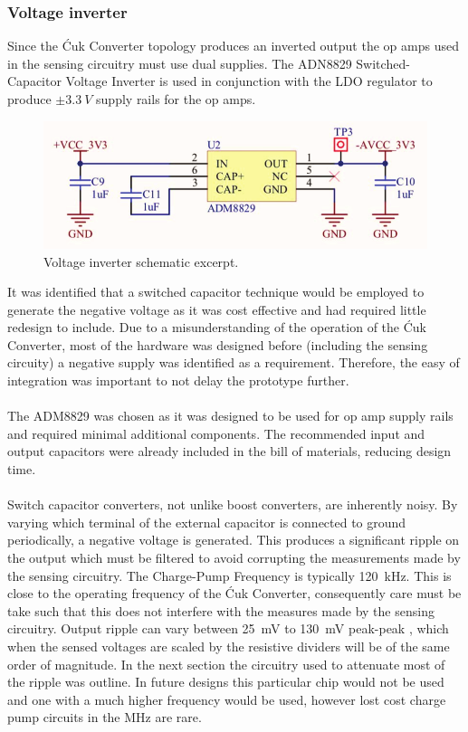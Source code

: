 \subsubsection{Voltage inverter}
Since the \'Cuk Converter topology produces an inverted output the op amps used in the sensing circuitry must use dual supplies. The ADN8829 Switched-Capacitor Voltage Inverter is used in conjunction with the LDO regulator to produce $\pm\SI{3.3}{V}$ supply rails for the op amps.
\begin{figure}[H]
    \centering
    \includegraphics[width = 12cm]{figures/hardware/inverter_schematic.pdf}
    \caption{Voltage inverter schematic excerpt.}
    \label{fig:inverter}
\end{figure}
It was identified that a switched capacitor technique would be employed to generate the negative voltage as it was cost effective and had required little redesign to include. Due to a misunderstanding of the operation of the \'Cuk Converter, most of the hardware was designed before (including the sensing circuity) a negative supply was identified as a requirement. Therefore, the easy of integration was important to not delay the prototype further.
\\ \\
The ADM8829 was chosen as it was designed to be used for op amp supply rails and required minimal additional components. The recommended input and output capacitors were already included in the bill of materials, reducing design time. 
\\ \\
Switch capacitor converters, not unlike boost converters, are inherently noisy. By varying which terminal of the external capacitor is connected to ground periodically, a negative voltage is generated. This produces a significant ripple on the output which must be filtered to avoid corrupting the measurements made by the sensing circuitry. The Charge-Pump Frequency is typically \SI{120}{kHz}. This is close to the operating frequency of the \'Cuk Converter, consequently care must be take such that this does not interfere with the measures made by the sensing circuitry. Output ripple can vary between \SI{25}{mV} to \SI{130}{mV} peak-peak \cite{adm8829}, which when the sensed voltages are scaled by the resistive dividers will be of the same order of magnitude. In the next section the circuitry used to attenuate most of the ripple was outline. In future designs this particular chip would not be used and one with a much higher frequency would be used, however lost cost charge pump circuits in the MHz are rare. 

